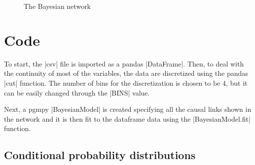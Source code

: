 \documentclass[a4paper, 12pt]{article}
\begin{document}
\begin{figure}
    \centering
    \caption{The Bayesian network}
    \label{fig:network}
\end{figure}


\section{Code}

To start, the \spverb|csv| file is imported as a pandas \spverb|DataFrame|. Then, to deal with the continuity of most of the variables, the data are discretized using the pandas \spverb|cut| function. The number of bins for the discretization is chosen to be 4, but it can be easily changed through the \spverb|BINS| value.

Next, a pgmpy \spverb|BayesianModel| is created specifying all the causal links shown in the network and it is then fit to the dataframe data using the \spverb|BayesianModel.fit| function.


\subsection{Conditional probability distributions}
\end{document}
